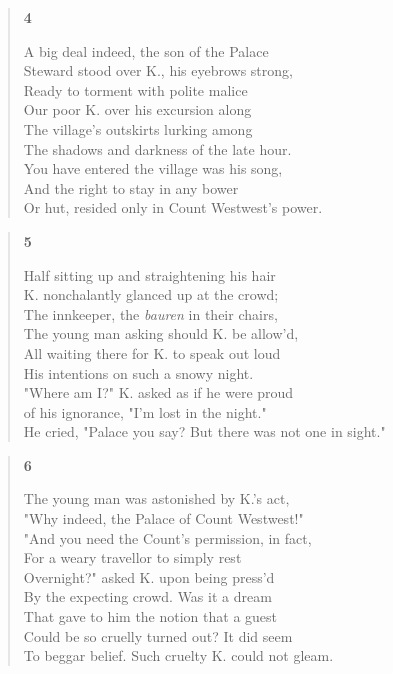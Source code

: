 \documentclass{article}
\begin{document}
\newpage
\begin{verse}
  \begin{center}
    \textbf{4} \\
  \end{center}
  A big deal indeed, the son of the Palace \\
  Steward stood over K., his eyebrows strong, \\
  Ready to torment with polite malice \\
  Our poor K. over his excursion along \\
  The village's outskirts lurking among \\
  The shadows and darkness of the late hour. \\
  You have entered the village was his song, \\
  And the right to stay in any bower \\
  Or hut, resided only in Count Westwest's power.
\end{verse}
\begin{verse}
  \begin{center}
    \textbf{5} \\
  \end{center}
  Half sitting up and straightening his hair \\
  K. nonchalantly glanced up at the crowd;  \\
  The innkeeper, the \textit{bauren} in their chairs,  \\
  The young man asking should K. be allow'd, \\
  All waiting there for K. to speak out loud \\
  His intentions on such a snowy night. \\
  "Where am I?" K. asked as if he were proud \\
  of his ignorance, "I'm lost in the night." \\
  He cried, "Palace you say? But there was not one in sight."
\end{verse}
\begin{verse}
  \begin{center}
    \textbf{6} \\
  \end{center}
  The young man was astonished by K.'s act, \\
  "Why indeed, the Palace of Count Westwest!" \\
  "And you need the Count's permission, in fact, \\
  For a weary travellor to simply rest \\
  Overnight?" asked K. upon being press'd \\
  By the expecting crowd. Was it a dream \\
  That gave to him the notion that a guest \\
  Could be so cruelly turned out? It did seem \\
  To beggar belief. Such cruelty K. could not gleam.
\end{verse}
\end{document}
